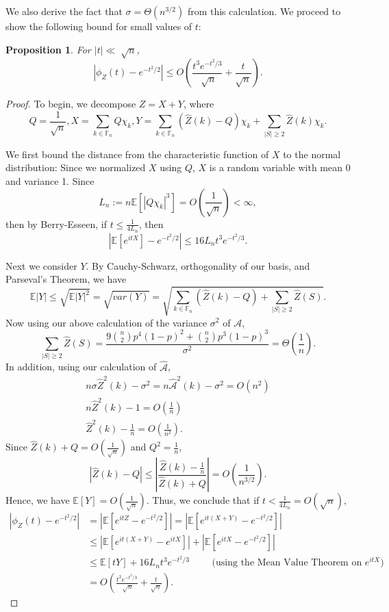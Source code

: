 \documentclass{article}
\newcommand{\p}[1]{\left(#1\right)}
\newcommand{\abs}[1]{\left\lvert#1\right\rvert}
\newcommand{\ap}{\mathcal{A}}
\newcommand{\E}{\mathbb{E}}
\newcommand{\F}{\mathbb{F}}
\newtheorem{prop}[thm]{Proposition}
\theoremstyle{definition}
\theoremstyle{remark}
\begin{document}
We also derive the fact that $\sigma = \Theta(n^{3/2})$ from this calculation. We proceed to show the following bound for small values of $t$: 
\begin{prop}
For $|t| \ll \sqrt[]{n}$, \[ \abs{\phi_Z(t) - e^{-t^2/2}} \leq O\left(\frac{t^3e^{-t^2/3}}{\sqrt[]{n}} + \frac{t}{\sqrt{n}}\right). \]
\end{prop}

\begin{proof}
To begin, we decompose $Z = X+Y$, where
\[Q = \frac{1}{\sqrt{n}}, X = \sum_{k \in \F_n} Q\chi_k, Y = \sum_{k \in \F_n} (\hat{Z}(k)-Q)\chi_k + \sum_{|S| \geq 2} \hat{Z}(k)\chi_k.\]

We first bound the distance from the characteristic function of $X$ to the normal distribution:
Since we normalized $X$ using $Q$, $X$ is a random variable with mean 0 and variance 1. Since \[L_n := n\E[|Q\chi_k|^3] = O\left(\frac{1}{\sqrt{n}}\right) < \infty, \]
then by Berry-Esseen, if $t \leq \frac{1}{4L_n}$, then \[|\E[e^{itX}] - e^{-t^2/2}| \leq 16L_{n}t^3e^{-t^2/3}.\]

Next we consider $Y$. By Cauchy-Schwarz, orthogonality of our basis, and Parseval's Theorem, we have 
\[ \E|Y| \leq \sqrt{\E|Y|^2} = \sqrt{var(Y)} = \sqrt{\sum_{k \in \F_n} (\hat{Z}(k)-Q) + \sum_{|S| \geq 2} \hat{Z}(S)}.\]
Now using our above calculation of the variance $\sigma^2$ of $\ap$, \[\sum_{|S| \geq 2} {\hat{Z}(S)} = \frac{9{{n}\choose{2}}p^4(1-p)^2+{n\choose2}p^3(1-p)^3}{\sigma^2} = \Theta\left(\frac{1}{n}\right).\]
In addition, using our calculation of $\hat{\ap}$,
\begin{align*}
n\sigma\hat{Z}^2(k) - \sigma^2 = n\hat{\ap}^2(k) - \sigma^2 = O(n^2)  \\
n\hat{Z}^2(k) - 1 = O\left(\frac{1}{n} \right) \\
\hat{Z}^2(k) - \frac{1}{n} = O\left(\frac{1}{n^2} \right).
\end{align*}
Since $\hat{Z}(k) + Q = O\left(\frac{1}{\sqrt{n}}\right)$ and $Q^2 = \frac{1}{n}$,
\[ \abs{\hat{Z}(k) - Q} \leq \abs{\frac{\hat{Z}(k) - \frac{1}{n}}{\hat{Z}(k)+Q}} = O\p{\frac{1}{n^{3/2}}}. \]
Hence, we have $\E[Y] = O\left(\frac{1}{\sqrt{n}}\right)$. 
Thus, we conclude that if $t < \frac{1}{4L_n} = O(\sqrt{n})$,
\begin{align*} 
\abs{\phi_Z(t) - e^{-t^2/2}}
&= \abs{\E[e^{itZ}-e^{-t^2/2}]} = \abs{\E[e^{it(X+Y)}-e^{-t^2/2}]} \\
&\leq \abs{\E[e^{it(X+Y)}-e^{itX}]} + \abs{\E[e^{itX}-e^{-t^2/2}]} \\
&\leq \E[tY] + 16L_{n}t^3e^{-t^2/3} \qquad \text{ (using the Mean Value Theorem on } e^{itX})\\
&= O\left(\frac{t^3e^{-t^2/3}}{\sqrt[]{n}} + \frac{t}{\sqrt{n}}\right).
\end{align*}




\end{proof}
\end{document}
